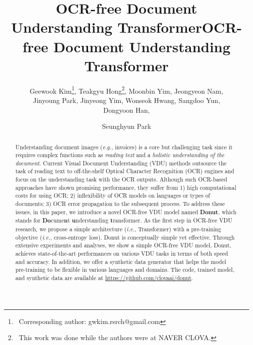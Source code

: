 \documentclass[runningheads]{llncs}
\newcommand\ours{{{\mbox{Donut}}}\xspace}
\newcommand\oursb{{\textbf{\mbox{Donut}}}\xspace}
\begin{document}
\pagestyle{headings}
\mainmatter

\title{OCR-free Document Understanding Transformer}



\title{OCR-free Document Understanding Transformer}
\author{Geewook Kim\thanks{\ Corresponding author: gwkim.rsrch@gmail.com}, Teakgyu Hong\thanks{\ This work was done while the authors were at NAVER CLOVA.}, Moonbin Yim, Jeongyeon Nam, \\ Jinyoung Park, Jinyeong Yim, Wonseok Hwang, Sangdoo Yun, \\ Dongyoon Han, \and Seunghyun Park}
\maketitle

\begin{abstract}
Understanding document images (\textit{e.g.}, invoices) is a core but challenging task since it requires complex functions such as \textit{reading text} and a \textit{holistic understanding of the document}.
Current Visual Document Understanding (VDU) methods outsource the task of reading text to off-the-shelf Optical Character Recognition (OCR) engines and focus on the understanding task with the OCR outputs.
Although such OCR-based approaches have shown promising performance, they suffer from 1) high computational costs for using OCR; 2) inflexibility of OCR models on languages or types of documents; 3) OCR error propagation to the subsequent process. 
To address these issues, in this paper, we introduce a novel OCR-free VDU model named \oursb, which stands for \textbf{Do}cume\textbf{n}t \textbf{u}nderstanding \textbf{t}ransformer.
As the first step in OCR-free VDU research, we propose a simple architecture (\textit{i.e.}, Transformer) with a pre-training objective (\textit{i.e.,} cross-entropy loss).
Donut is conceptually simple yet effective. Through extensive experiments and analyses, we show a simple OCR-free VDU model, \ours, achieves state-of-the-art performances on various VDU tasks in terms of both speed and accuracy.
In addition, we offer a synthetic data generator that helps the model pre-training to be flexible in various languages and domains.
The code, trained model, and synthetic data are available at \url{https://github.com/clovaai/donut}.
\end{abstract}
\end{document}
